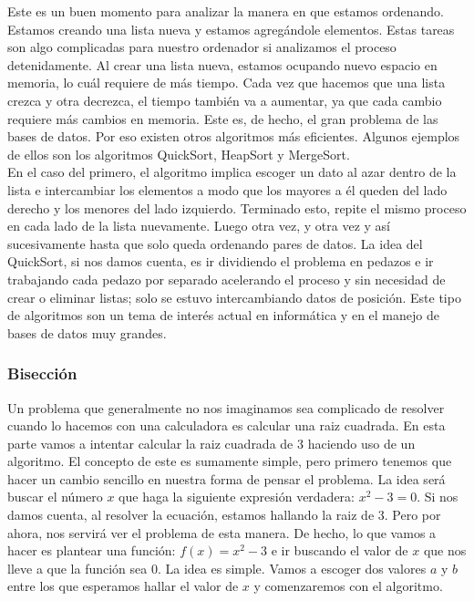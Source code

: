 \documentclass[10pt,letterpaper]{article}
\begin{document}
Este es un buen momento para analizar la manera en que estamos ordenando. Estamos creando una lista nueva y estamos agreg\'andole elementos. Estas tareas son algo complicadas para nuestro ordenador si analizamos el proceso detenidamente. Al crear una lista nueva, estamos ocupando nuevo espacio en memoria, lo cu\'al requiere de m\'as tiempo. Cada vez que hacemos que una lista crezca y otra decrezca, el tiempo tambi\'en va a aumentar, ya que cada cambio requiere m\'as cambios en memoria. Este es, de hecho, el gran problema de las bases de datos. Por eso existen otros algoritmos m\'as eficientes. Algunos ejemplos de ellos son los algoritmos QuickSort, HeapSort y MergeSort.\\

En el caso del primero, el algoritmo implica escoger un dato al azar dentro de la lista e intercambiar los elementos a modo que los mayores a \'el queden del lado derecho y los menores del lado izquierdo. Terminado esto, repite el mismo proceso en cada lado de la lista nuevamente. Luego otra vez, y otra vez y as\'i sucesivamente hasta que solo queda ordenando pares de datos. La idea del QuickSort, si nos damos cuenta, es ir dividiendo el problema en pedazos e ir trabajando cada pedazo por separado acelerando el proceso y sin necesidad de crear o eliminar listas; solo se estuvo intercambiando datos de posici\'on. Este tipo de algoritmos son un tema de inter\'es actual en inform\'atica y en el manejo de bases de datos muy grandes.

\subsubsection{Bisecci\'on}
Un problema que generalmente no nos imaginamos sea complicado de resolver cuando lo hacemos con una calculadora es calcular una raiz cuadrada. En esta parte vamos a intentar calcular la raiz cuadrada de 3 haciendo uso de un algoritmo. El concepto de este es sumamente simple, pero primero tenemos que hacer un cambio sencillo en nuestra forma de pensar el problema. La idea ser\'a buscar el n\'umero $x$ que haga la siguiente expresi\'on verdadera: $x^2 - 3 = 0$. Si nos damos cuenta, al resolver la ecuaci\'on, estamos hallando la raiz de 3. Pero por ahora, nos servir\'a ver el problema de esta manera. De hecho, lo que vamos a hacer es plantear una funci\'on: $f \left( x \right) = x^2 - 3$ e ir buscando el valor de $x$ que nos lleve a que la funci\'on sea $0$. La idea es simple. Vamos a escoger dos valores $a$ y $b$ entre los que esperamos hallar el valor de $x$ y comenzaremos con el algoritmo.
\end{document}
